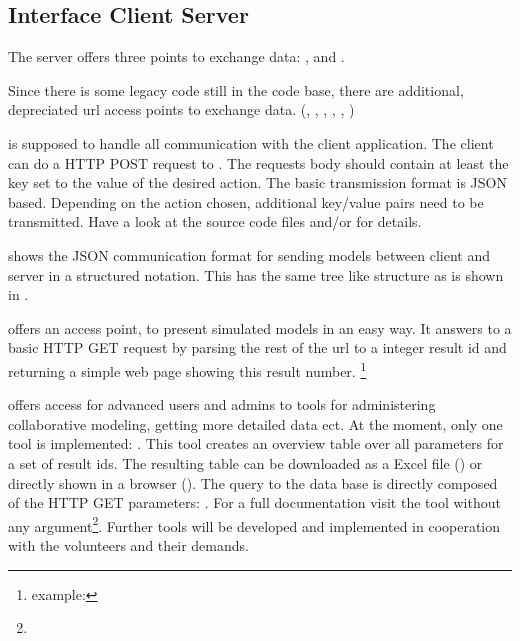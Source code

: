 \subsection{Interface Client Server}
\label{sec:iface_c_s}

The server offers three points to exchange data: ,  and .

Since there is some legacy code still in the code base, there are additional, depreciated url access points to exchange data. (, , , , , )

 is supposed to handle all communication with the client application.
The client can do a HTTP POST request to \splurl[api].
The requests body should contain at least the key  set to the value of the desired action.
The basic transmission format is JSON based.
Depending on the action chosen, additional key/value pairs need to be transmitted.
Have a look at the source code files  and/or  for details.





 shows the JSON communication format for sending models between client and server in a structured notation. This has the same tree like structure as is shown in .


 offers an access point, to present simulated models in an easy way.
It answers to a basic HTTP GET request by parsing the rest of the url to a integer result id and returning a simple web page showing this result number.
\splurl[<result-id>]\footnote{example: \splurl[1337]}


 offers access for advanced users and admins to tools for administering collaborative modeling, getting more detailed data ect.
At the moment, only one tool is implemented: .
This tool creates an overview table over all parameters for a set of result ids.
The resulting table can be downloaded as a Excel file () or directly shown in a browser ().
The query to the data base is directly composed of the HTTP GET parameters:
\splurl[tools/ResultDataTable?6696,6904-7000\&type=html].
For a full documentation visit the tool without any argument\footnote{}.
Further tools will be developed and implemented in cooperation with the volunteers and their demands.


